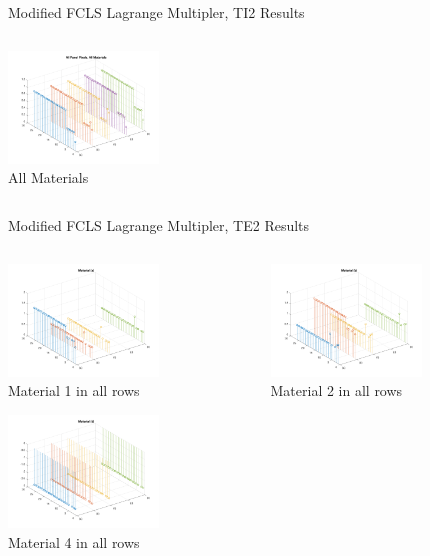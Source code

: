 \documentclass{beamer}
\begin{document}
\begin{frame}{Modified FCLS Lagrange Multipler, TI2 Results}
\begin{columns}
\begin{column}{0.33\textwidth}
        \includegraphics[width=4cm,center]{mfcls2_ti2_allmaterials}
        \\ All Materials
        \centering
    \end{column}
\end{columns}
\end{frame} 


\begin{frame}{Modified FCLS Lagrange Multipler, TE2 Results}
\begin{columns}
    \begin{column}{0.33\textwidth}
        \includegraphics[width=4cm,center]{mfcls2_te2_material_stem_1}
        \\ Material 1 in all rows
        \centering

        \includegraphics[width=4cm,center]{mfcls2_te2_material_stem_4}
        \\ Material 4 in all rows
        \centering
    \end{column}
    \begin{column}{0.33\textwidth}
        \includegraphics[width=4cm,center]{mfcls2_te2_material_stem_2}
        \\ Material 2 in all rows
        \centering


\end{column}
\end{columns}
\end{frame}
\end{document}
